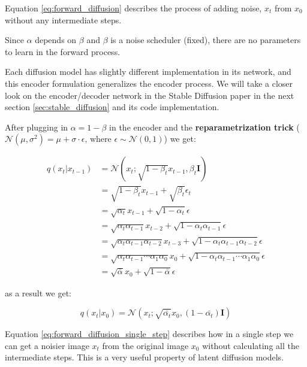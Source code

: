Equation \ref{eq:forward_diffusion} describes the process of adding noise, $x_t$ from $x_0$ without any intermediate steps.

Since $\alpha$ depends on $\beta$ and $\beta$ is a noise scheduler (fixed), there are no parameters to learn in the forward process.

Each diffusion model has slightly different implementation in its network, and this encoder formulation generalizes the encoder process. We will take a closer look on the encoder/decoder network in the Stable Diffusion paper \cite{stable_diffusion} in the next section \ref{sec:stable_diffusion} and its code implementation.

After plugging in $\alpha = 1 - \beta$ in the encoder and the \textbf{reparametrization trick} ($\mathcal{N} (\mu, \sigma^2) = \mu + \sigma \cdot \epsilon \text{, where } \epsilon \sim \mathcal{N}(0, 1) $) we get:

\begin{align*}
    q(x_t | x_{t-1}) &= \mathcal{N} \left( x_t; \sqrt{1-\beta_t} x_{t-1}, \beta_t \mathbf{I} \right) \\
    &= \sqrt{1-\beta_t} x_{t-1} + \sqrt{\beta_t} \epsilon_t \\
    &= \sqrt{\alpha_t} x_{t-1} + \sqrt{1 - \alpha_t} \epsilon \\
    &= \sqrt{\alpha_t \alpha_{t-1}} x_{t-2} + \sqrt{1 - \alpha_t \alpha_{t-1}} \epsilon \\
    &= \sqrt{\alpha_t \alpha_{t-1} \alpha_{t-2}} x_{t-3} + \sqrt{1 - \alpha_t \alpha_{t-1} \alpha_{t-2}} \epsilon \\
    &= \sqrt{\alpha_t \alpha_{t-1} \cdots \alpha_1 \alpha_0} x_0 + \sqrt{1 - \alpha_t \alpha_{t-1} \cdots \alpha_1 \alpha_0} \epsilon \\
    &= \boxed{ \sqrt{\bar{\alpha}} x_0 + \sqrt{1 - \bar{\alpha}} \epsilon }
\end{align*}

as a result we get:

\begin{equation}
    q(x_t | x_0) = \mathcal{N} (x_t; \sqrt{\bar{\alpha_t}} x_0, (1-\bar{\alpha_t}) \mathbf{I})
    \label{eq:forward_diffusion_single_step}
\end{equation}

Equation \ref{eq:forward_diffusion_single_step} describes how in a single step we can get a noisier image $x_t$ from the original image $x_0$ without calculating all the intermediate steps. This is a very useful property of latent diffusion models.







